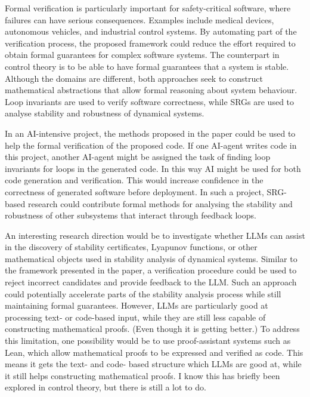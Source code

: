 \documentclass[a4paper, 11pt]{article}
\begin{document}
Formal verification is particularly important for safety-critical software, where failures can have serious consequences. Examples include medical devices, autonomous vehicles, and industrial control systems. By automating part of the verification process, the proposed framework could reduce the effort required to obtain formal guarantees for complex software systems. The counterpart in control theory is to be able to have formal guarantees that a system is stable. Although the domains are different, both approaches seek to construct mathematical abstractions that allow formal reasoning about system behaviour. Loop invariants are used to verify software correctness, while SRGs are used to analyse stability and robustness of dynamical systems.

In an AI-intensive project, the methods proposed in the paper could be used to help the formal verification of the proposed code. If one AI-agent writes code in this project, another AI-agent might be assigned the task of finding loop invariants for loops in the generated code. In this way AI might be used for both code generation and verification. This would increase confidence in the correctness of generated software before deployment. In such a project, SRG-based research could contribute formal methods for analysing the stability and robustness of other subsystems that interact through feedback loops.

An interesting research direction would be to investigate whether LLMs can assist in the discovery of stability certificates, Lyapunov functions, or other mathematical objects used in stability analysis of dynamical systems. Similar to the framework presented in the paper, a verification procedure could be used to reject incorrect candidates and provide feedback to the LLM. Such an approach could potentially accelerate parts of the stability analysis process while still maintaining formal guarantees. However, LLMs are particularly good at processing text- or code-based input, while they are still less capable of constructing mathematical proofs. (Even though it is getting better.) To address this limitation, one possibility would be to use proof-assistant systems such as Lean, which allow mathematical proofs to be expressed and verified as code. This means it gets the text- and code- based structure which LLMs are good at, while it still helps constructing mathematical proofs. I know this has briefly been explored in control theory, but there is still a lot to do.   
\end{document}
